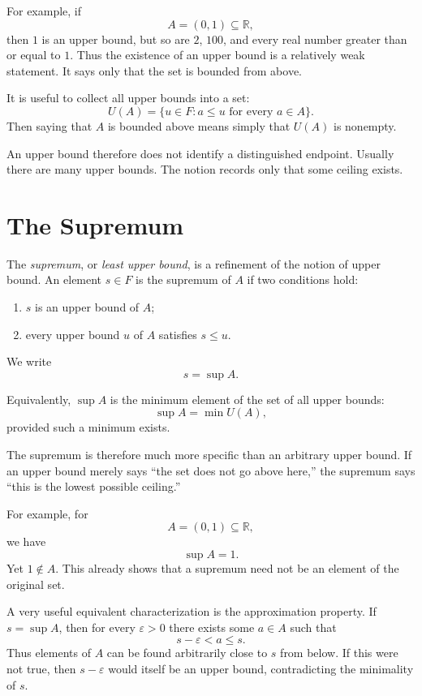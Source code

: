 \documentclass{essay}
\begin{document}
For example, if
\[ A=(0,1)\subseteq\mathbb{R}, \]
then \(1\) is an upper bound, but so are \(2\), \(100\), and every real number greater than or equal to \(1\). Thus the existence of an upper bound is a relatively weak statement. It says only that the set is bounded from above.

It is useful to collect all upper bounds into a set:
\[ U(A)=\{u\in F : a\leq u\text{ for every }a\in A\}. \]
Then saying that \(A\) is bounded above means simply that \(U(A)\) is nonempty.

An upper bound therefore does not identify a distinguished endpoint. Usually there are many upper bounds. The notion records only that some ceiling exists.

\section{The Supremum}

The \emph{supremum}, or \emph{least upper bound}, is a refinement of the notion of upper bound. An element \(s\in F\) is the supremum of \(A\) if two conditions hold:
\begin{enumerate}
  \item \(s\) is an upper bound of \(A\);
  \item every upper bound \(u\) of \(A\) satisfies \(s\leq u\).
\end{enumerate}

We write
\[ s=\sup A. \]

Equivalently, \(\sup A\) is the minimum element of the set of all upper bounds:
\[ \sup A=\min U(A), \]
provided such a minimum exists.

The supremum is therefore much more specific than an arbitrary upper bound. If an upper bound merely says ``the set does not go above here,'' the supremum says ``this is the lowest possible ceiling.''

For example, for
\[ A=(0,1)\subseteq\mathbb{R}, \]
we have
\[ \sup A=1. \]
Yet \(1\notin A\). This already shows that a supremum need not be an element of the original set.

A very useful equivalent characterization is the approximation property. If \(s=\sup A\), then for every \(\varepsilon>0\) there exists some \(a\in A\) such that
\[ s-\varepsilon<a\leq s. \]
Thus elements of \(A\) can be found arbitrarily close to \(s\) from below. If this were not true, then \(s-\varepsilon\) would itself be an upper bound, contradicting the minimality of \(s\).
\end{document}
